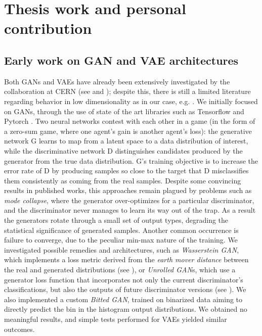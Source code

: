 \documentclass{scrartcl} %
\begin{document}
	\section*{Thesis work and personal contribution}
	
	\subsection*{Early work on GAN and VAE architectures}
	Both GANs and VAEs have already been extensively investigated by the collaboration at CERN (see \cite{2019glhc} and \cite{otten2021event}); despite this, there is still a limited literature regarding behavior in low dimensionality as in our case, e.g. \cite{523096}. We initially focused on GANs, through the use of state of the art libraries such as Tensorflow \cite{tensorflow2015-whitepaper} and Pytorch \cite{NEURIPS2019_9015}. Two neural networks contest with each other in a game (in the form of a zero-sum game, where one agent's gain is another agent's loss):  the generative network G learns to map from a latent space to a data distribution of interest, while the discriminative network D distinguishes candidates produced by the generator from the true data distribution. G's training objective is to increase the error rate of D by producing samples so close to the target that D misclassifies them consistently as coming from the real samples. Despite some convincing results in published works, this approaches remain plagued by problems such as \emph{mode collapse}, where the generator over-optimizes for a particular discriminator, and the discriminator never manages to learn its way out of the trap. As a result the generators rotate through a small set of output types, degrading the statistical significance of generated samples. Another common occurrence is failure to converge, due to the peculiar min-max nature of the training.
	We investigated possible remedies and architectures, such as \emph{Wasserstein GAN}, which implements a loss metric derived from the \emph{earth mover distance} between the real and generated distributions (see \cite{arjovsky2017wasserstein}), or \emph{Unrolled GAN}s, which use a generator loss function that incorporates not only the current discriminator's classifications, but also the outputs of future discriminator versions (see \cite{metz2017unrolled}). We also implemented a custom \emph{Bitted GAN}, trained on binarized data aiming to directly predict the bin in the histogram output distributions.
	We obtained no meaningful results, and simple tests performed for VAEs yielded similar outcomes.
	
\end{document}

